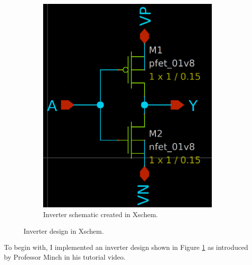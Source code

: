 \documentclass[11pt]{article}
\begin{document}
\begin{figure}[!ht]
\begin{subfigure}{0.5\linewidth}
            \includegraphics[width=\linewidth]{inverter_sch.png}
            \caption{Inverter schematic created in Xschem.}
        \end{subfigure}
        \caption{Inverter design in Xschem.}
        \label{fig:inv}
    \end{figure}
    To begin with, I implemented an inverter design shown in Figure \ref{fig:inv} as introduced by Professor Minch in his tutorial video.
\end{document}
